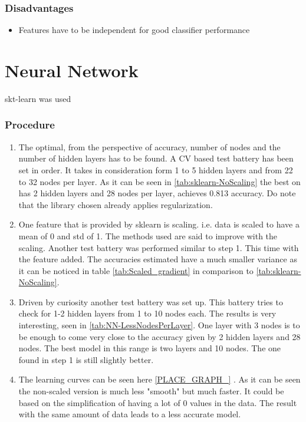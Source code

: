 \documentclass{article}
\begin{document}
\subsubsection{Disadvantages}
\begin{itemize}
	\item Features have to be independent for good classifier performance
\end{itemize}


\section{Neural Network}
skt-learn was used 

\subsubsection{Procedure}

\begin{enumerate}
	\item The optimal, from the perspective of accuracy, number of nodes and the number of hidden layers has to be found. A CV based test battery has been set in order. It takes in consideration form 1 to 5 hidden layers and from 22 to 32 nodes per layer. As it can be seen in \ref{tab:sklearn-NoScaling} the best on has 2 hidden layers and 28 nodes per layer, achieves 0.813 accuracy. Do note that the library chosen already applies regularization.
	
	\item One feature that is provided by sklearn is scaling. i.e. data is scaled to have a mean of 0 and std of 1. The methods used are said to improve with the scaling. Another test battery was performed similar to step 1. This time with the feature added. The accuracies estimated have a much smaller variance as it can be noticed in table \ref{tab:Scaled_gradient} in comparison to  \ref{tab:sklearn-NoScaling}.
	
	\item Driven by curiosity another test battery was set up. This battery tries to check for 1-2 hidden layers from 1 to 10 nodes each. The results is very interesting, seen in \ref{tab:NN-LessNodesPerLayer}. One layer with 3 nodes is to be enough to come very close to the accuracy given by 2 hidden layers and 28 nodes. The best model in this range is two layers and 10 nodes. The one found in step 1 is still slightly better.
	
	\item The learning curves can be seen here \ref{PLACE_GRAPH_} . As it can be seen the non-scaled version is much less "smooth" but much faster. It could be based on the simplification of having a lot of 0 values in the data. The result with the same amount of data leads to a less accurate model.
	
\end{enumerate}
\end{document}
